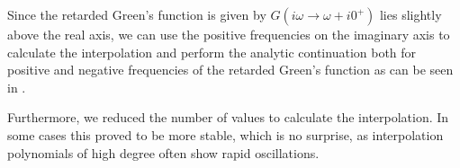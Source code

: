 \begin{appendix}
Since the retarded Green's function is given by $G(i ω \to ω + i 0^+)$ lies slightly above the real axis, we can use the positive frequencies on the imaginary axis to calculate the interpolation and perform the analytic continuation both for positive and negative frequencies of the retarded Green's function as can be seen in .

Furthermore, we reduced the number of values to calculate the interpolation. In some cases this proved to be more stable, which is no surprise, as interpolation polynomials of high degree often show rapid oscillations.


\end{appendix}
